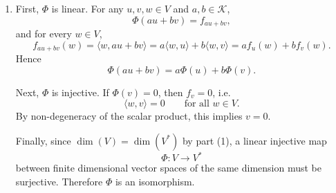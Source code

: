 \begin{proofenv}
\begin{enumerate}
        \item First, $\Phi$ is linear. For any $u,v,w\in V$ and $a,b\in \mathcal{K}$,
        \[
        \Phi(au+bv)=f_{au+bv},
        \]
        and for every $w\in V$,
        \[
        f_{au+bv}(w)
        =
        \langle w,au+bv\rangle
        =
        a\langle w,u\rangle+b\langle w,v\rangle
        =
        af_u(w)+bf_v(w).
        \]
        Hence
        \[
        \Phi(au+bv)=a\Phi(u)+b\Phi(v).
        \]

        Next, $\Phi$ is injective. If $\Phi(v)=0$, then $f_v=0$, i.e.
        \[
        \langle w,v\rangle=0
        \qquad
        \text{for all } w\in V.
        \]
        By non-degeneracy of the scalar product, this implies $v=0$.

        Finally, since $\dim(V)=\dim(V^*)$ by part (1), a linear injective map
        \[
        \Phi:V\to V^*
        \]
        between finite dimensional vector spaces of the same dimension must be surjective. Therefore $\Phi$ is an isomorphism.
    \end{enumerate}
    \end{proofenv}

